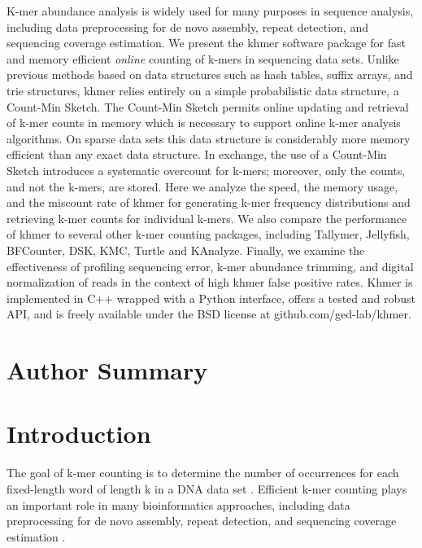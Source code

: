 \documentclass[10pt]{article}
\begin{document}
K-mer abundance analysis is widely used for many purposes in sequence
analysis, including data preprocessing for de novo assembly, repeat
detection, and sequencing coverage estimation.  We present the khmer
software package for fast and memory efficient {\em online} counting
of k-mers in sequencing data sets. Unlike previous methods based on
data structures such as hash tables, suffix arrays, and trie
structures, khmer relies entirely on a simple probabilistic data
structure, a Count-Min Sketch.  The Count-Min Sketch permits online
updating and retrieval of k-mer counts in memory which is necessary to
support online k-mer analysis algorithms.  On sparse data sets this
data structure is considerably more memory efficient than any exact
data structure.  In exchange, the use of a Count-Min Sketch introduces
a systematic overcount for k-mers; moreover, only the counts, and not
the k-mers, are stored.  Here we analyze the speed, the memory usage,
and the miscount rate of khmer for generating k-mer frequency
distributions and retrieving k-mer counts for individual k-mers.  We
also compare the performance of khmer to several other k-mer counting
packages, including Tallymer, Jellyfish, BFCounter, DSK, KMC, Turtle
 and KAnalyze.
Finally, we examine
the effectiveness of profiling sequencing error, k-mer abundance
trimming, and digital normalization of reads in the context of high
khmer false positive rates. Khmer is implemented in C++ wrapped with a Python
interface, offers a tested and robust API, and is freely available
under the BSD license at github.com/ged-lab/khmer.


\section*{Author Summary}

\section*{Introduction}

The goal of k-mer counting is to determine the number of occurrences
for each fixed-length word of length k in a DNA data set
\cite{Marcais2011}. Efficient k-mer counting plays an important role
in many bioinformatics approaches, including data preprocessing for de
novo assembly, repeat detection, and sequencing coverage estimation
\cite{Kurtz2008}.
\end{document}
